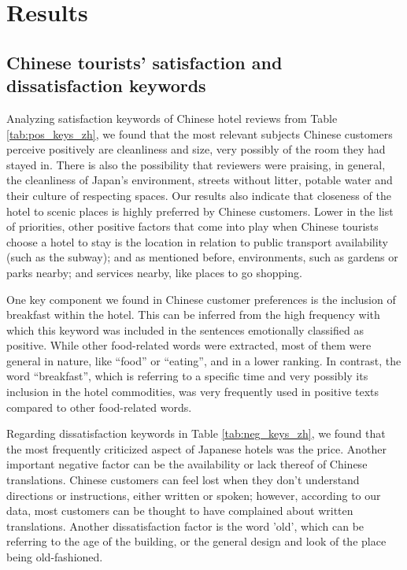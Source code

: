 \documentclass[review]{elsarticle}
\begin{document}
\section{Results}\label{results}

\subsection{Chinese tourists' satisfaction and dissatisfaction keywords}

Analyzing satisfaction keywords of Chinese hotel reviews from Table \ref{tab:pos_keys_zh}, we found that the most relevant subjects Chinese customers perceive positively are cleanliness and size, very possibly of the room they had stayed in. There is also the possibility that reviewers were praising, in general, the cleanliness of Japan’s environment, streets without litter, potable water and their culture of respecting spaces. Our results also indicate that closeness of the hotel to scenic places is highly preferred by Chinese customers. Lower in the list of priorities, other positive factors that come into play when Chinese tourists choose a hotel to stay is the location in relation to public transport availability (such as the subway); and as mentioned before, environments, such as gardens or parks nearby; and services nearby, like places to go shopping. 

One key component we found in Chinese customer preferences is the inclusion of breakfast within the hotel. This can be inferred from the high frequency with which this keyword was included in the sentences emotionally classified as positive. While other food-related words were extracted, most of them were general in nature, like “food” or “eating”, and in a lower ranking. In contrast, the word “breakfast”, which is referring to a specific time and very possibly its inclusion in the hotel commodities, was very frequently used in positive texts compared to other food-related words. 

Regarding dissatisfaction keywords in Table \ref{tab:neg_keys_zh}, we found that the most frequently criticized aspect of Japanese hotels was the price. Another important negative factor can be the availability or lack thereof of Chinese translations. Chinese customers can feel lost when they don't understand directions or instructions, either written or spoken; however, according to our data, most customers can be thought to have complained about written translations. Another dissatisfaction factor is the word 'old', which can be referring to the age of the building, or the general design and look of the place being old-fashioned.
\end{document}
